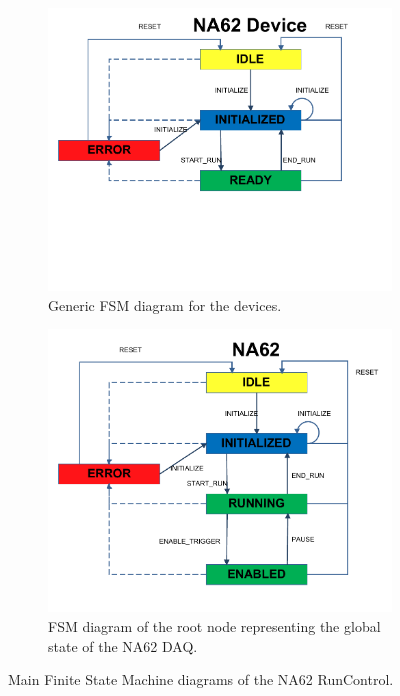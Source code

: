 \documentclass[a4paper]{article}
\begin{document}
\begin{figure}
	\centering
	\begin{subfigure}{0.4\textwidth}
		\includegraphics[width=\textwidth]{Doc/TEL62FSM.pdf}
		\caption{Generic FSM diagram for the devices.\newline}
		\label{fig:FSM_Device}
	\end{subfigure}
	\begin{subfigure}{0.4\textwidth}
		\includegraphics[width=\textwidth]{Doc/NA62_EN.pdf}
		\caption{FSM diagram of the root node representing the global state of the NA62 DAQ.}
		\label{fig:FSM_Main}
	\end{subfigure}
	\caption{Main Finite State Machine diagrams of the NA62 RunControl.}
\end{figure}
\end{document}
